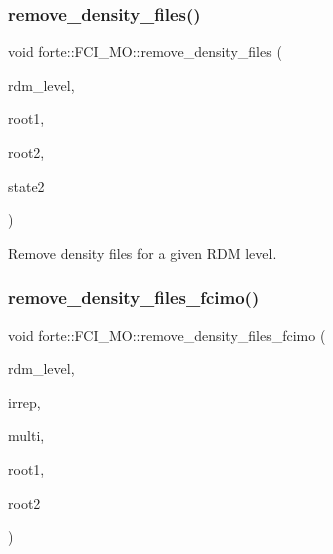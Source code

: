 \subsubsection{\texorpdfstring{remove\+\_\+density\+\_\+files()}{remove\_density\_files()}}
{\footnotesize\ttfamily void forte\+::\+F\+C\+I\+\_\+\+M\+O\+::remove\+\_\+density\+\_\+files (\begin{DoxyParamCaption}\item[{int}]{rdm\+\_\+level,  }\item[{int}]{root1,  }\item[{int}]{root2,  }\item[{const \mbox{\hyperlink{classforte_1_1_state_info}{State\+Info}} \&}]{state2 }\end{DoxyParamCaption})}



Remove density files for a given R\+DM level. 

\mbox{\label{classforte_1_1_f_c_i___m_o_a70dca7ba9d158baf66c26f830dcb91a6}} 
\subsubsection{\texorpdfstring{remove\+\_\+density\+\_\+files\+\_\+fcimo()}{remove\_density\_files\_fcimo()}}
{\footnotesize\ttfamily void forte\+::\+F\+C\+I\+\_\+\+M\+O\+::remove\+\_\+density\+\_\+files\+\_\+fcimo (\begin{DoxyParamCaption}\item[{int}]{rdm\+\_\+level,  }\item[{int}]{irrep,  }\item[{int}]{multi,  }\item[{int}]{root1,  }\item[{int}]{root2 }\end{DoxyParamCaption})}

\mbox{\label{classforte_1_1_f_c_i___m_o_aa191172f2d1053787846c37905f884c0}} 
